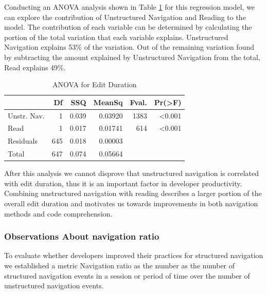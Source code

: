 \documentclass{sig-alternate}
\begin{document}
Conducting an ANOVA analysis shown in Table \ref{editDurationANOVA} for this regression model, we can explore the contribution of Unstructured Navigation and Reading to the model.  The contribution of each variable can be determined by calculating the portion of the total variation that each variable explains.  Unstructured Navigation explains 53\% of the variation.  Out of the remaining variation found by subtracting the amount explained by Unstructured Navigation from the total, Read explains 49\%.  

\begin{table}[!t]

\begin{mdframed}[linecolor=white]
\begin{tabular}{|l|r|r|r|r|r|}
\hline
                          &  Df  & SSQ & MeanSq &Fval.   & Pr(>F)    \\
\hline
Unstr. Nav.& 1 & 0.039& 0.03920 & 1383 & <0.001\\
\hline
Read                 & 1 & 0.017 & 0.01741 & 614 & <0.001\\
\hline
Residuals                & 645 & 0.018 & 0.00003   &  &  \\
\hline
Total		& 647 & 0.074 & 0.05664 & & \\
\hline
\end{tabular}
\caption{ANOVA for Edit Duration}
\label{editDurationANOVA}
\end{mdframed}\end{table}

After this analysis we cannot disprove that unstructured navigation is correlated with edit duration, thus it is an important factor in developer productivity.  Combining unstructured navigation with reading describes a larger portion of the overall edit duration and motivates us towards improvements in both navigation methods and code comprehension.  

\subsubsection{Observations About navigation ratio}

To evaluate whether developers improved their practices for structured navigation we established a metric Navigation ratio as the number as the number of structured navigation events in a session or period of time over the number of unstructured navigation events.  
\end{document}

